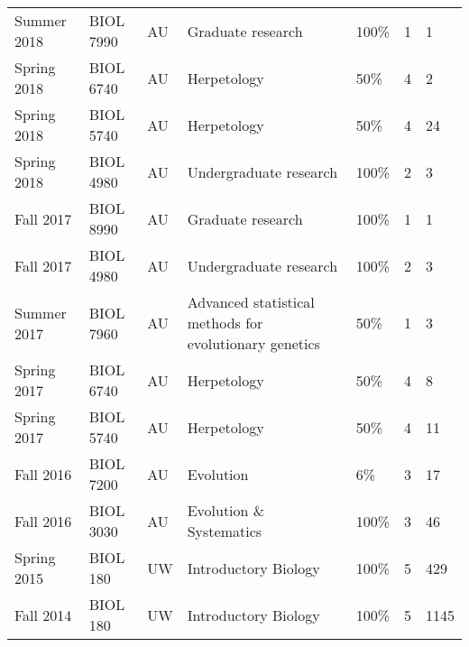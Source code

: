 {\begin{longtable}[l]{ @{} p{0.7in} p{0.7in} p{0.7in} p{1.5in} p{0.7in} p{0.4in} p{0.8in} @{} }
    Summer 2018 & BIOL 7990 & AU & Graduate research & 100\% & 1 & 1 \\ 
    Spring 2018 & BIOL 6740 & AU & Herpetology & 50\% & 4 & 2 \\
    Spring 2018 & BIOL 5740 & AU & Herpetology & 50\% & 4 & 24 \\
    Spring 2018 & BIOL 4980 & AU & Undergraduate research & 100\% & 2 & 3 \\ 
    Fall 2017 & BIOL 8990 & AU & Graduate research & 100\% & 1 & 1 \\ 
    Fall 2017 & BIOL 4980 & AU & Undergraduate research & 100\% & 2 & 3 \\ 
    Summer 2017 & BIOL 7960 & AU & Advanced statistical methods for evolutionary genetics & 50\% & 1 & 3 \\
    Spring 2017 & BIOL 6740 & AU & Herpetology & 50\% & 4 & 8 \\
    Spring 2017 & BIOL 5740 & AU & Herpetology & 50\% & 4 & 11 \\
    Fall 2016 & BIOL 7200 & AU & Evolution & 6\% & 3 & 17 \\
    Fall 2016 & BIOL 3030 & AU & Evolution \& Systematics & 100\% & 3 & 46 \\
    Spring 2015 & BIOL 180 & UW & Introductory Biology & 100\% & 5 & 429 \\
    Fall 2014 & BIOL 180 & UW & Introductory Biology & 100\% & 5 & 1145 \\
\end{longtable}
}
